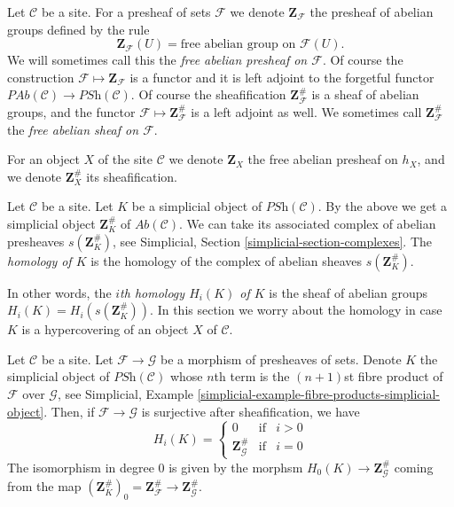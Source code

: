 \noindent
Let $\mathcal{C}$ be a site.
For a presheaf of sets $\mathcal{F}$ we denote $\mathbf{Z}_\mathcal{F}$
the presheaf of abelian groups defined by the rule
$$
\mathbf{Z}_\mathcal{F}(U) = \text{free abelian group on }\mathcal{F}(U).
$$
We will sometimes call this the {\it free abelian presheaf on $\mathcal{F}$}.
Of course the construction $\mathcal{F} \mapsto \mathbf{Z}_\mathcal{F}$
is a functor and it is left adjoint to the forgetful functor
$\textit{PAb}(\mathcal{C}) \to \textit{PSh}(\mathcal{C})$.
Of course the sheafification $\mathbf{Z}_\mathcal{F}^\#$ is
a sheaf of abelian groups, and the functor
$\mathcal{F} \mapsto \mathbf{Z}_\mathcal{F}^\#$ is a
left adjoint as well. We sometimes call $\mathbf{Z}_\mathcal{F}^\#$
the {\it free abelian sheaf on $\mathcal{F}$}.

\medskip\noindent
For an object $X$ of the site $\mathcal{C}$ we denote
$\mathbf{Z}_X$ the free abelian presheaf on $h_X$, and
we denote $\mathbf{Z}_X^\#$ its sheafification.

\begin{definition}
\label{definition-homology}
Let $\mathcal{C}$ be a site.
Let $K$ be a simplicial object of $\textit{PSh}(\mathcal{C})$.
By the above we get a simplicial object $\mathbf{Z}_K^\#$ of
$\textit{Ab}(\mathcal{C})$. We can take its associated
complex of abelian presheaves $s(\mathbf{Z}_K^\#)$, see
Simplicial, Section \ref{simplicial-section-complexes}.
The {\it homology of $K$} is the homology of the
complex of abelian sheaves $s(\mathbf{Z}_K^\#)$.
\end{definition}

\noindent
In other words, the {\it $i$th homology $H_i(K)$ of $K$}
is the sheaf of abelian groups $H_i(K) = H_i(s(\mathbf{Z}_K^\#))$.
In this section we worry about the homology in case $K$
is a hypercovering of an object $X$ of $\mathcal{C}$.

\begin{lemma}
\label{lemma-compare-cosk0}
Let $\mathcal{C}$ be a site.
Let $\mathcal{F} \to \mathcal{G}$ be a morphism
of presheaves of sets. Denote $K$ the simplicial
object of $\textit{PSh}(\mathcal{C})$ whose $n$th
term is the $(n + 1)$st fibre product of $\mathcal{F}$
over $\mathcal{G}$, see
Simplicial, Example \ref{simplicial-example-fibre-products-simplicial-object}.
Then, if $\mathcal{F} \to \mathcal{G}$ is surjective after
sheafification, we have
$$
H_i(K) =
\left\{
\begin{matrix}
0 & \text{if} & i > 0\\
\mathbf{Z}_\mathcal{G}^\# & \text{if} & i = 0
\end{matrix}
\right.
$$
The isomorphism in degree $0$ is given by the
morphsm $H_0(K) \to \mathbf{Z}_\mathcal{G}^\#$
coming from the map $(\mathbf{Z}_K^\#)_0 =
\mathbf{Z}_\mathcal{F}^\# \to \mathbf{Z}_\mathcal{G}^\#$.
\end{lemma}


